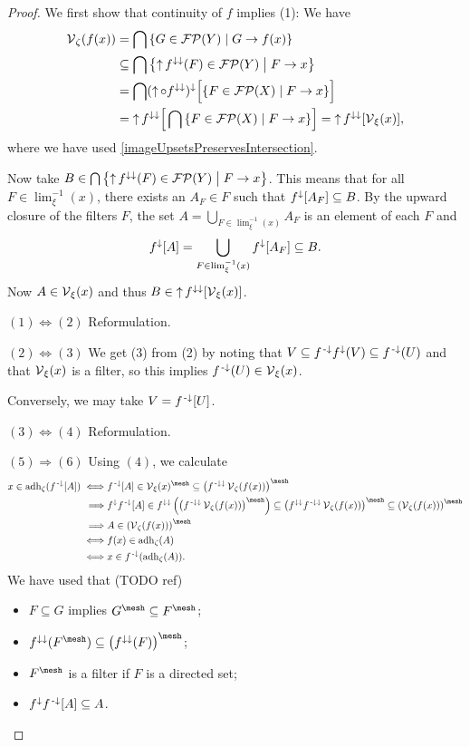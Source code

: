 \begin{proof}
We first show that continuity of $f$ implies (1): We have
\begin{align*}
\vicinity_\zeta(f(x)) &= \bigcap\setbuilder{G\in\powerfilters(Y)}{G\to f(x)} \\
&\subseteq \bigcap\setbuilder{\upset f^{\imf\imf}(F)\in\powerfilters(Y)}{F\to x} \\
&= \bigcap (\upset\circ f^{\imf\imf})^{\imf}\Big[\setbuilder{F\in\powerfilters(X)}{F\to x}\Big] \\
&= \upset f^{\imf\imf}\Big[\bigcap \setbuilder{F\in\powerfilters(X)}{F\to x}\Big] = \upset f^{\imf\imf}[\vicinity_\xi(x)],
\end{align*}
where we have used \ref{imageUpsetsPreservesIntersection}.

Now take $B\in \bigcap\setbuilder{\upset f^{\imf\imf}(F)\in\powerfilters(Y)}{F\to x}$. This means that for all $F\in\lim^{-1}_\xi(x)$, there exists an $A_F\in F$ such that $f^\downarrow[A_F]\subseteq B$. By the upward closure of the filters $F$, the set $A = \bigcup_{F\in \lim^{-1}_\xi(x)}A_F$ is an element of each $F$ and
\[ f^\downarrow[A] = \bigcup_{F\in \lim^{-1}_\xi(x)}f^{\downarrow}[A_F] \subseteq B.  \]
Now $A\in \operatorname{\mathcal{V}}_\xi(x)$ and thus $B\in \operatorname{\uparrow} f^{\downarrow\downarrow}[\operatorname{\mathcal{V}}_\xi(x)]$.


$(1) \Leftrightarrow (2)$ Reformulation.

$(2) \Leftrightarrow (3)$ We get (3) from (2) by noting that $V\subseteq f^{{\text{\hspace{0.15em}-}\downarrow}}f^\downarrow(V) \subseteq f^{\text{\hspace{0.15em}-}\downarrow}(U)$ and that $\operatorname{\mathcal{V}}_\xi(x)$ is a filter, so this implies $f^{\text{\hspace{0.15em}-}\downarrow}(U)\in \operatorname{\mathcal{V}}_\xi(x)$.

Conversely, we may take $V = f^{{\text{\hspace{0.15em}-}\downarrow}}[U]$.

$(3) \Leftrightarrow (4)$ Reformulation.

$(5) \Rightarrow (6)$ Using $(4)$, we calculate
\begin{align*}
x\in \adh_\zeta(f^\preimf[A]) \iff& f^\preimf[A]\in \vicinity_\xi(x)^{\mesh} \subseteq \left(f^{\preimf\imf}\vicinity_\zeta(f(x))\right)^{\mesh} \\
\implies& f^\imf f^\preimf[A] \in f^{\imf\imf}\left(\left(f^{\preimf\imf}\vicinity_\zeta(f(x))\right)^{\mesh}\right) \subseteq \left(f^{\imf\imf} f^{\preimf\imf}\vicinity_\zeta(f(x))\right)^{\mesh} \subseteq \left(\vicinity_\zeta(f(x))\right)^{\mesh} \\
\implies& A \in \left(\vicinity_\zeta(f(x))\right)^{\mesh} \\
\iff& f(x)\in \adh_\zeta(A) \\
\iff& x\in f^{\preimf}(\adh_\zeta(A)).
\end{align*}
We have used that (TODO ref)
\begin{itemize}
\item $F\subseteq G$ implies $G^{\mesh} \subseteq F^{\mesh}$;
\item $f^{\imf\imf}(F^{\mesh}) \subseteq \left(f^{\imf\imf}(F)\right)^{\mesh}$;
\item $F^{\mesh}$ is a filter if $F$ is a directed set;
\item $f^\downarrow f^{\text{\hspace{0.15em}-}\downarrow}[A] \subseteq A$.
\end{itemize}


\end{proof}
